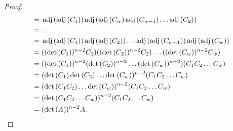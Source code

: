 \documentclass[../libro.tex]{subfiles}
\begin{document}
\begin{proof}
\begin{align*}
        = {} &
        \operatorname{adj} {(\operatorname{adj} {(C_1)})}
        \operatorname{adj}
        {(\operatorname{adj} {(C_w)}
                \operatorname{adj} {(C_{w-1})}
                \dots
        \operatorname{adj} {(C_2)})}
        \\
        = {} &
        \dots
        \\
        = {} &
        \operatorname{adj} {(\operatorname{adj} {(C_1)})}
        \operatorname{adj} {(\operatorname{adj} {(C_2)})}
        \dots
        \operatorname{adj} {(\operatorname{adj} {(C_{w-1})})}
        \operatorname{adj} {(\operatorname{adj} {(C_w)})}
        \\
        = {} &
        ((\det {(C_1)})^{n-2} C_1)
        ((\det {(C_2)})^{n-2} C_2)
        \dots
        ((\det {(C_w)})^{n-2} C_{w})
        \\
        = {} &
        ((\det {(C_1)})^{n-2}
            (\det {(C_2)})^{n-2}
            \dots
        (\det {(C_w)})^{n-2})
        (C_1 C_2 \dots C_w)
        \\
        = {} &
        (\det {(C_1)} \det {(C_2)} \dots \det {(C_w)})^{n-2}
        (C_1 C_2 \dots C_w)
        \\
        = {} &
        (\det {(C_1 C_2)} \dots \det {(C_w)})^{n-2}
        (C_1 C_2 \dots C_w)
        \\
        = {} &
        (\det {(C_1 C_2 \dots C_w)})^{n-2}
        (C_1 C_2 \dots C_w)
        \\
        = {} &
        (\det {(A)})^{n-2} A.
        \qedhere
    \end{align*}
\end{proof}
\end{document}
